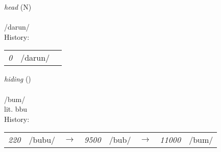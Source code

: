 \vspace{15pt}
\begin{nopagebreak}
 \textit{head} (N)\\
\\
\noindent /d{\textprimstress}arun/\\


\noindent History:

\vspace{-0pt}
\hspace{40pt}
\begin{tabular}{ccc}
\textit{0} & /darun/& \\
\end{tabular}

\vspace{20pt}\hline

\end{nopagebreak}
\filbreak



\vspace{15pt}
\begin{nopagebreak}
 \textit{hiding} ()\\
\\
\noindent /b{\textprimstress}um/\\
\noindent lit. bbu\\


\noindent History:

\vspace{-0pt}
\hspace{40pt}
\begin{tabular}{ccc}
\textit{220} & /bubu/&$\rightarrow$ & \textit{9500} & /bub/&$\rightarrow$ & \textit{11000} & /bum/& \\
\end{tabular}

\vspace{20pt}\hline

\end{nopagebreak}
\filbreak



